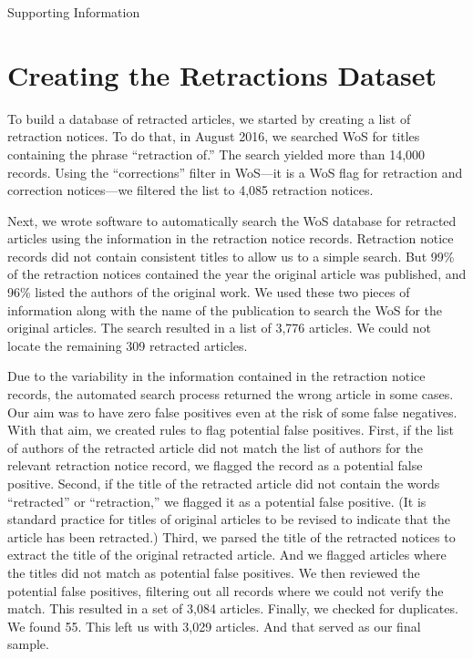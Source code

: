 \documentclass[12pt, letterpaper]{article}
\begin{document}
\clearpage
\appendix
\renewcommand{\thesection}{SI \arabic{section}}
\renewcommand\thetable{\thesection.\arabic{table}}  
\renewcommand\thefigure{\thesection.\arabic{figure}}
\setcounter{figure}{0}
\setcounter{section}{0}
\setcounter{table}{0}

\begin{center}
\Large{Supporting Information}
\end{center}

\section{Creating the Retractions Dataset}
\label{data_collection}

To build a database of retracted articles, we started by creating a list of retraction notices. To do that, in August 2016, we searched WoS for titles containing the phrase ``retraction of.'' The search yielded more than 14,000 records. Using the ``corrections'' filter in WoS---it is a WoS flag for retraction and correction notices---we filtered the list to 4,085 retraction notices.

Next, we wrote software to automatically search the WoS database for retracted articles using the information in the retraction notice records. Retraction notice records did not contain consistent titles to allow us to a simple search. But 99\% of the retraction notices contained the year the original article was published, and 96\% listed the authors of the original work. We used these two pieces of information along with the name of the publication to search the WoS for the original articles. The search resulted in a list of 3,776 articles. We could not locate the remaining 309 retracted articles.

Due to the variability in the information contained in the retraction notice records, the automated search process returned the wrong article in some cases. Our aim was to have zero false positives even at the risk of some false negatives. With that aim, we created rules to flag potential false positives. First, if the list of authors of the retracted article did not match the list of authors for the relevant retraction notice record, we flagged the record as a potential false positive. Second, if the title of the retracted article did not contain the words ``retracted'' or ``retraction,'' we flagged it as a potential false positive. (It is standard practice for titles of original articles to be revised to indicate that the article has been retracted.) Third, we parsed the title of the retracted notices to extract the title of the original retracted article. And we flagged articles where the titles did not match as potential false positives. We then reviewed the potential false positives, filtering out all records where we could not verify the match. This resulted in a set of 3,084 articles. Finally, we checked for duplicates. We found 55. This left us with 3,029 articles. And that served as our final sample. 
\end{document}
